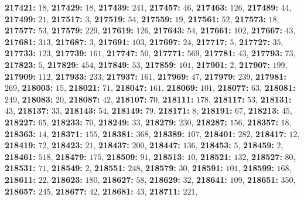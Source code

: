 \textsf{\bfseries 217421:} $18$, \textsf{\bfseries 217429:} $18$, \textsf{\bfseries 217439:} $241$, \textsf{\bfseries 217457:} $46$, \textsf{\bfseries 217463:} $126$, \textsf{\bfseries 217489:} $44$, \textsf{\bfseries 217499:} $21$, \textsf{\bfseries 217517:} $3$, \textsf{\bfseries 217519:} $54$, \textsf{\bfseries 217559:} $19$, \textsf{\bfseries 217561:} $52$, \textsf{\bfseries 217573:} $18$, \textsf{\bfseries 217577:} $53$, \textsf{\bfseries 217579:} $229$, \textsf{\bfseries 217619:} $126$, \textsf{\bfseries 217643:} $54$, \textsf{\bfseries 217661:} $102$, \textsf{\bfseries 217667:} $43$, \textsf{\bfseries 217681:} $313$, \textsf{\bfseries 217687:} $3$, \textsf{\bfseries 217691:} $103$, \textsf{\bfseries 217697:} $24$, \textsf{\bfseries 217717:} $5$, \textsf{\bfseries 217727:} $35$, \textsf{\bfseries 217733:} $123$, \textsf{\bfseries 217739:} $161$, \textsf{\bfseries 217747:} $50$, \textsf{\bfseries 217771:} $569$, \textsf{\bfseries 217781:} $43$, \textsf{\bfseries 217793:} $73$, \textsf{\bfseries 217823:} $5$, \textsf{\bfseries 217829:} $454$, \textsf{\bfseries 217849:} $53$, \textsf{\bfseries 217859:} $101$, \textsf{\bfseries 217901:} $2$, \textsf{\bfseries 217907:} $199$, \textsf{\bfseries 217909:} $112$, \textsf{\bfseries 217933:} $233$, \textsf{\bfseries 217937:} $161$, \textsf{\bfseries 217969:} $47$, \textsf{\bfseries 217979:} $239$, \textsf{\bfseries 217981:} $269$, \textsf{\bfseries 218003:} $15$, \textsf{\bfseries 218021:} $71$, \textsf{\bfseries 218047:} $161$, \textsf{\bfseries 218069:} $101$, \textsf{\bfseries 218077:} $63$, \textsf{\bfseries 218081:} $249$, \textsf{\bfseries 218083:} $20$, \textsf{\bfseries 218087:} $42$, \textsf{\bfseries 218107:} $70$, \textsf{\bfseries 218111:} $178$, \textsf{\bfseries 218117:} $53$, \textsf{\bfseries 218131:} $43$, \textsf{\bfseries 218137:} $33$, \textsf{\bfseries 218143:} $54$, \textsf{\bfseries 218149:} $79$, \textsf{\bfseries 218171:} $8$, \textsf{\bfseries 218191:} $67$, \textsf{\bfseries 218213:} $45$, \textsf{\bfseries 218227:} $65$, \textsf{\bfseries 218233:} $70$, \textsf{\bfseries 218249:} $33$, \textsf{\bfseries 218279:} $230$, \textsf{\bfseries 218287:} $156$, \textsf{\bfseries 218357:} $18$, \textsf{\bfseries 218363:} $14$, \textsf{\bfseries 218371:} $155$, \textsf{\bfseries 218381:} $368$, \textsf{\bfseries 218389:} $107$, \textsf{\bfseries 218401:} $282$, \textsf{\bfseries 218417:} $12$, \textsf{\bfseries 218419:} $72$, \textsf{\bfseries 218423:} $21$, \textsf{\bfseries 218437:} $200$, \textsf{\bfseries 218447:} $136$, \textsf{\bfseries 218453:} $5$, \textsf{\bfseries 218459:} $2$, \textsf{\bfseries 218461:} $518$, \textsf{\bfseries 218479:} $175$, \textsf{\bfseries 218509:} $91$, \textsf{\bfseries 218513:} $10$, \textsf{\bfseries 218521:} $132$, \textsf{\bfseries 218527:} $80$, \textsf{\bfseries 218531:} $71$, \textsf{\bfseries 218549:} $2$, \textsf{\bfseries 218551:} $248$, \textsf{\bfseries 218579:} $30$, \textsf{\bfseries 218591:} $101$, \textsf{\bfseries 218599:} $168$, \textsf{\bfseries 218611:} $22$, \textsf{\bfseries 218623:} $180$, \textsf{\bfseries 218627:} $58$, \textsf{\bfseries 218629:} $32$, \textsf{\bfseries 218641:} $109$, \textsf{\bfseries 218651:} $350$, \textsf{\bfseries 218657:} $245$, \textsf{\bfseries 218677:} $42$, \textsf{\bfseries 218681:} $43$, \textsf{\bfseries 218711:} $221$, 
